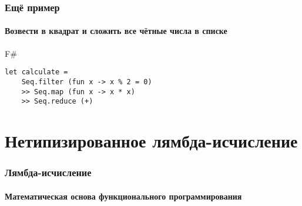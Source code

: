 \documentclass[xetex,mathserif,serif]{beamer}
\begin{document}
	\begin{frame}[fragile]
		\frametitle{Ещё пример}
		\framesubtitle{Возвести в квадрат и сложить все чётные числа в списке}
		\begin{exampleblock}{F\#}
			\begin{lstlisting}
let calculate = 
    Seq.filter (fun x -> x % 2 = 0) 
    >> Seq.map (fun x -> x * x) 
    >> Seq.reduce (+)
            \end{lstlisting}
		\end{exampleblock}
\end{frame}

	\section{Нетипизированное лямбда-исчисление}

	\begin{frame}
		\frametitle{Лямбда-исчисление}
		\framesubtitle{Математическая основа функционального программирования}
	\end{frame}
		
\end{document}
